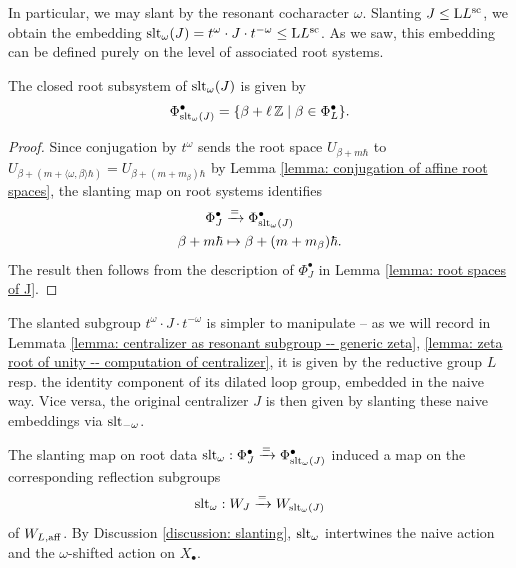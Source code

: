  



In particular, we may slant by the resonant cocharacter $\omega$. 
Slanting $J \leq \mathrm{L} L^{\mathrm{sc}}$, we obtain the embedding $\operatorname{slt}_{\omega}(J) = t^{\omega} \cdot J \cdot t^{-\omega} \leq \mathrm{L} L^{\mathrm{sc}}$.
As we saw, this embedding can be defined purely on the level of associated root systems.
%
\begin{lemma}\label{discussion: slanting J in general}
The closed root subsystem of $\operatorname{slt}_{\omega}(J)$ is given by
\begin{equation*}
    \Phi^{\bullet}_{\operatorname{slt}_{\omega}(J)} = \{ \beta + \ell \operatorname{\mathbb{Z}} \mid \beta \in \Phi^{\bullet}_L \}.
\end{equation*} 
\end{lemma}
\begin{proof}
Since conjugation by $t^{\omega}$ sends the root space $U_{\beta + m\hbar}$ to $U_{\beta + (m + \langle \omega, \beta \rangle \hbar )} = U_{\beta + (m + m_{\beta}) \hbar}$ by Lemma \ref{lemma: conjugation of affine root spaces}, the slanting map on root systems identifies
\begin{align*}
   \Phi^{\bullet}_J &\xrightarrow{=} \Phi^{\bullet}_{\operatorname{slt}_{\omega}(J)} \\
   \beta + m\hbar &\mapsto \beta + (m + m_{\beta})\hbar.
\end{align*}
The result then follows from the description of $\Phi^{\bullet}_J$ in Lemma \ref{lemma: root spaces of J}.
\end{proof}

The slanted subgroup $t^{\omega} \cdot J \cdot t^{-\omega}$ is simpler to manipulate -- as we will record in Lemmata \ref{lemma: centralizer as resonant subgroup -- generic zeta}, \ref{lemma: zeta root of unity -- computation of centralizer}, it is given by the reductive group $L$ resp. the identity component of its dilated loop group, embedded in the naive way. Vice versa, the original centralizer $J$ is then given by slanting these naive embeddings via $\operatorname{slt}_{-\omega}$.


\begin{remark}\label{remark: slanting on weyl groups general case}
The slanting map on root data $\operatorname{slt}_{\omega}: \Phi^{\bullet}_J \xrightarrow{=} \Phi^{\bullet}_{\operatorname{slt}_{\omega}(J)}$ induced a map on the corresponding reflection subgroups
\begin{equation*}
    \operatorname{slt}_{\omega}: W_J \xrightarrow{=} W_{\operatorname{slt}_{\omega}(J)}
\end{equation*}
of $W_{L, \mathrm{aff}}$. By Discussion \ref{discussion: slanting}, $\operatorname{slt}_{\omega}$ intertwines the naive action and the $\omega$-shifted action on $X_{\bullet}$.
\end{remark}




